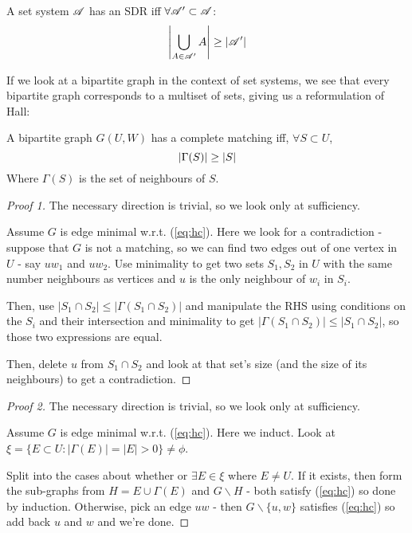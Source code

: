 \documentclass[a4paper]{article}
\begin{document}
{\begin{thm-num}[Hall, 1935]
	A set system $\mathscr{A}$ has an SDR iff $\forall\mathscr{A}'\subset\mathscr{A}$:
	$$\left|\bigcup_{A\in\mathscr{A}'}A\right|\geq\left|\mathscr{A}'\right|$$
\end{thm-num}

If we look at a bipartite graph in the context of set systems, we see that every bipartite graph corresponds to a multiset of sets, giving us a reformulation of Hall:

\addtocounter{cor-num}{-1}
\begin{thm-num}
	A bipartite graph $G(U,W)$ has a complete matching iff, $\forall S\subset U$,
	\begin{equation}\index{Hall!criterion}\label{eq:hc}
		\left|\Gamma(S)\right|\geq|S|
	\end{equation}
	Where $\Gamma(S)$ is the set of neighbours of $S$.
\end{thm-num}
\begin{proof}[Proof 1]
	The necessary direction is trivial, so we look only at sufficiency.
	
	Assume $G$ is edge minimal w.r.t. (\ref{eq:hc}). Here we look for a contradiction - suppose that $G$ is not a matching, so we can find two edges out of one vertex in $U$ - say $uw_1$ and $uw_2$. Use minimality to get two sets $S_1, S_2$ in $U$ with the same number neighbours as vertices and $u$ is the only neighbour of $w_i$ in $S_i$.
	
	Then, use $\left|S_1\cap S_2\right|\leq\left|\Gamma\left(S_1\cap S_2\right)\right|$ and manipulate the RHS using conditions on the $S_i$ and their intersection and minimality to get $\left|\Gamma\left(S_1\cap S_2\right)\right|\leq\left|S_1\cap S_2\right|$, so those two expressions are equal.
	
	Then, delete $u$ from $S_1\cap S_2$ and look at that set's size (and the size of its neighbours) to get a contradiction.
\end{proof}
\begin{proof}[Proof 2]
	The necessary direction is trivial, so we look only at sufficiency.
		
	Assume $G$ is edge minimal w.r.t. (\ref{eq:hc}). Here we induct. Look at $\xi=\{E\subset U : \left|\Gamma(E)\right|=|E|>0\}\neq\phi$.
	
	Split into the cases about whether or $\exists E\in \xi$ where $E\neq U$. If it exists, then form the sub-graphs from $H=E\cup\Gamma(E)$ and $G\smallsetminus H$ - both satisfy (\ref{eq:hc}) so done by induction. Otherwise, pick an edge $uw$ - then $G\smallsetminus \{u,w\}$ satisfies (\ref{eq:hc}) so add back $u$ and $w$ and we're done.
\end{proof}

}
\end{document}
